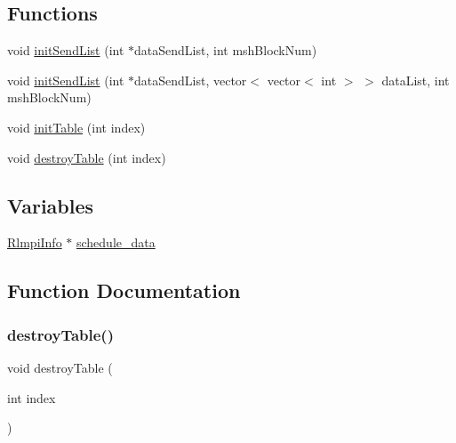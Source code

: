 \subsection*{Functions}
\begin{DoxyCompactItemize}
\item 
void \mbox{\hyperlink{tools_2RL__MPI_2register_8H_a4e113cf30f6198d50fb212074effcc61}{init\+Send\+List}} (int $\ast$data\+Send\+List, int msh\+Block\+Num)
\item 
void \mbox{\hyperlink{tools_2RL__MPI_2register_8H_ace23239002b4fdf135d4ad20ae2df6e7}{init\+Send\+List}} (int $\ast$data\+Send\+List, vector$<$ vector$<$ int $>$ $>$ data\+List, int msh\+Block\+Num)
\item 
void \mbox{\hyperlink{tools_2RL__MPI_2register_8H_a14fad51cfceca5a582218c98bdb3d769}{init\+Table}} (int index)
\item 
void \mbox{\hyperlink{tools_2RL__MPI_2register_8H_a099f07ebad307cc1509766f32cfcba5f}{destroy\+Table}} (int index)
\end{DoxyCompactItemize}
\subsection*{Variables}
\begin{DoxyCompactItemize}
\item 
\mbox{\hyperlink{structRlmpiInfo}{Rlmpi\+Info}} $\ast$ \mbox{\hyperlink{tools_2RL__MPI_2register_8H_a67febbff53bf6fe81c504cad6803fca8}{schedule\+\_\+data}}
\end{DoxyCompactItemize}


\subsection{Function Documentation}
\mbox{\label{tools_2RL__MPI_2register_8H_a099f07ebad307cc1509766f32cfcba5f}} 
\subsubsection{\texorpdfstring{destroyTable()}{destroyTable()}}
{\footnotesize\ttfamily void destroy\+Table (\begin{DoxyParamCaption}\item[{int}]{index }\end{DoxyParamCaption})}

